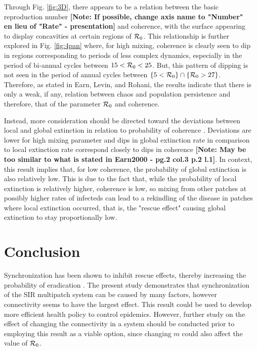 \documentclass[twocolumn,nofootinbib,showkeys,twoside,floatfix,unsortedaddress,flushbottom,10pt,aps,pra]{report}
\begin{document}
Through Fig. \ref{fig:3D}, there appears to be a relation between the basic reproduction number \textbf{[Note: If possible, change axis name to "Number" en lieu of "Rate" - presentation]} and coherence, with the surface appearing to display concavities at certain regions of ${\cal R}_0$. This relationship is further explored in Fig. \ref{fig:4pan} where, for high mixing, coherence is clearly seen to dip in regions corresponding to periods of less complex dynamics, especially in the period of bi-annual cycles between $15<{\cal R}_0<25$. But, this pattern of dipping is not seen in the period of annual cycles between $\{5<{\cal R}_0\}\cap\{{\cal R}_0>27\}$. Therefore, as stated in Earn, Levin, and Rohani, the results indicate that there is only a weak, if any, relation between chaos and population persistence\cite{Earn2000} and therefore, that of the parameter ${\cal R}_0$ and coherence. \par \smallskip \qquad
Instead, more consideration should be directed toward the deviations between local and global extinction in relation to probability of coherence \cite{Earn2000,Heino1997}. Deviations are lower for high mixing parameter and dips in global extinction rate in comparison to local extinction rate correspond closely to dips in coherence \textbf{[Note: May be too similar to what is stated in Earn2000 - pg.2 col.3 p.2 l.1]}. In context, this result implies that, for low coherence, the probability of global extinction is also relatively low. This is due to the fact that, while the probability of local extinction is relatively higher, coherence is low, so mixing from other patches at possibly higher rates of infecteds can lead to a rekindling of the disease in patches where local extinction occurred, that is, the "rescue effect" causing global extinction to stay proportionally low.
\section{Conclusion} 

Synchronization has been shown to inhibit rescue effects, thereby increasing the probability of eradication  \cite{Earn2000}. The present study demonstrates that synchronization of the SIR multipatch system can be caused by many factors, however connectivity seems to have the largest effect. This result could be used to develop more efficient health policy to control epidemics. However, further study on the effect of changing the connectivity in a system should be conducted prior to employing this result as a viable option, since changing $m$ could also affect the value of ${\cal R}_0$. 

\onecolumn
{}%

 
\end{document}

